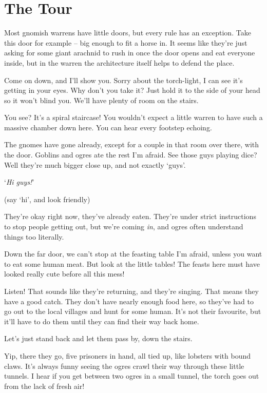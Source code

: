 \chapter{The Tour}

\begin{multicols}{2}

\begin{exampletext}
\noindent
Most gnomish warrens have little doors, but every rule has an exception.
Take this door for example -- big enough to fit a horse in.
It seems like they're just asking for some giant arachnid to rush in once the door opens and eat everyone inside, but in the \gls{warren} the architecture itself helps to defend the place.

Come on down, and I'll show you.
Sorry about the torch-light, I can see it's getting in your eyes.
Why don't you take it?
Just hold it to the side of your head so it won't blind you.
We'll have plenty of room on the stairs.

You see?
It's a spiral staircase!
You wouldn't expect a little warren to have such a massive chamber down here.
You can hear every footstep echoing.

The gnomes have gone already, except for a couple in that room over there, with the door.
Goblins and ogres ate the rest I'm afraid.
See those guys playing dice?
Well they're much bigger close up, and not exactly `guys'.

`\textit{Hi guys!}'

(say `hi', and look friendly)

They're okay right now, they've already eaten.
They're under strict instructions to stop people getting out, but we're coming \textit{in}, and ogres often understand things too literally.

Down the far door, we can't stop at the feasting table I'm afraid, unless you want to eat some human meat.
But look at the little tables!
The feasts here must have looked really cute before all this mess!

Listen!
That sounds like they're returning, and they're singing.
That means they have a good catch.
They don't have nearly enough food here, so they've had to go out to the local \glspl{village} and hunt for some human.
It's not their favourite, but it'll have to do them until they can find their way back home.

Let's just stand back and let them pass by, down the stairs.

Yip, there they go, five prisoners in hand, all tied up, like lobsters with bound claws.
It's always funny seeing the ogres crawl their way through these little tunnels.
I hear if you get between two ogres in a small tunnel, the torch goes out from the lack of fresh air!


\end{exampletext}
\end{multicols}
